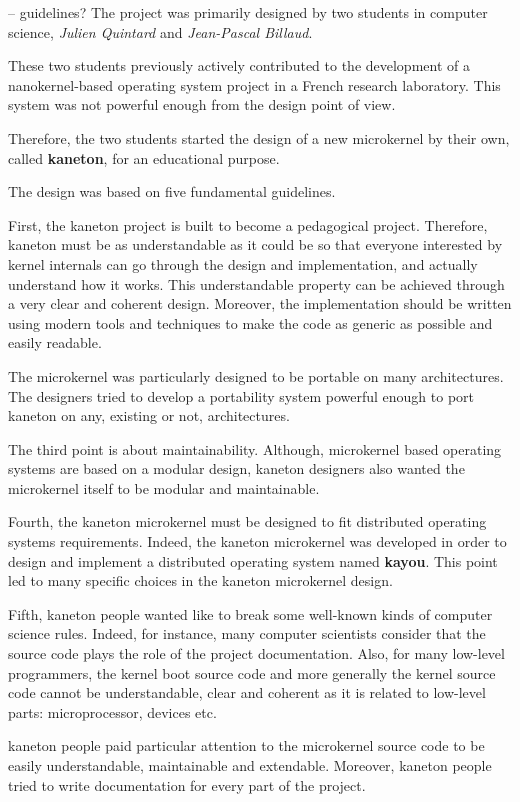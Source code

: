 
-- guidelines?
The project was primarily designed by two students in computer science,
\textit{Julien Quintard} and \textit{Jean-Pascal Billaud}.

These two students previously actively contributed to the development
of a nanokernel-based operating system project in a French research laboratory.
This system was not powerful enough from the design point of view.

Therefore, the two students started the design of a new microkernel
by their own, called \textbf{kaneton}, for an educational purpose.

The design was based on five fundamental guidelines.

First, the kaneton project is built to become a pedagogical project.
Therefore, kaneton must be as understandable as it could be so that everyone
interested by kernel internals can go through the design and implementation,
and actually understand how it works. This understandable property can be
achieved through a very clear and coherent design. Moreover, the implementation
should be written using modern tools and techniques to make the code
as generic as possible and easily readable.

The microkernel was particularly designed to be portable on many architectures.
The designers tried to develop a portability system powerful enough to port
kaneton on any, existing or not, architectures.

The third point is about maintainability. Although, microkernel based operating
systems are based on a modular design, kaneton designers also wanted the
microkernel itself to be modular and maintainable.

Fourth, the kaneton microkernel must be designed to fit distributed operating
systems requirements. Indeed, the kaneton microkernel was developed in order
to design and implement a distributed operating system named \textbf{kayou}.
This point led to many specific choices in the kaneton microkernel design.

Fifth, kaneton people wanted like to break some well-known kinds of computer
science rules. Indeed, for instance, many computer scientists consider that
the source code plays the role of the project documentation. Also, for many
low-level programmers, the kernel boot source code and more generally the
kernel source code cannot be understandable, clear and coherent as it is
related to low-level parts: microprocessor, devices etc.

kaneton people paid particular attention to the microkernel source code to be
easily understandable, maintainable and extendable. Moreover, kaneton
people tried to write documentation for every part of the project.

